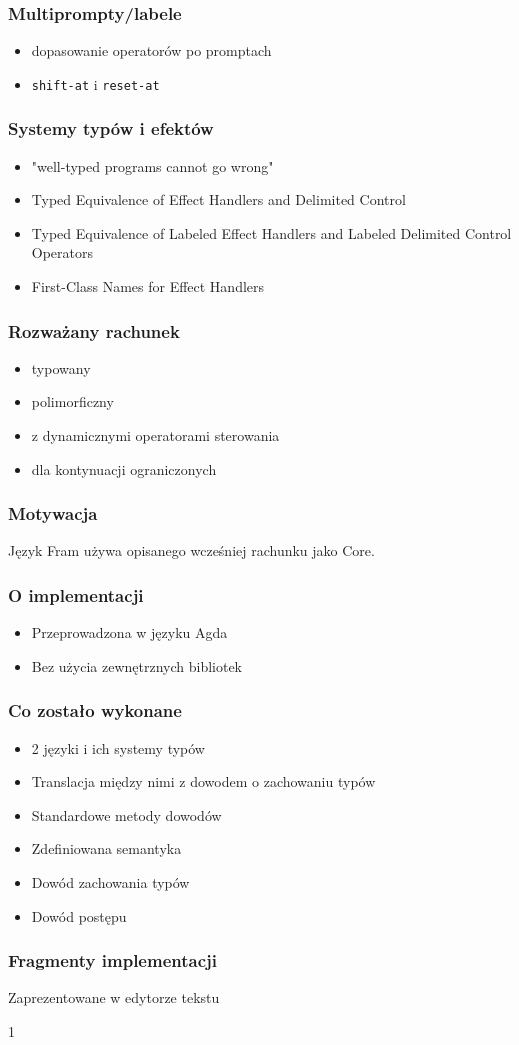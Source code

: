 \documentclass[polish]{beamer}
\begin{document}
\begin{frame}
\frametitle{Multiprompty/labele}
\begin{itemize}
\item dopasowanie operatorów po promptach
\item \texttt{shift-at} i \texttt{reset-at}
\end{itemize}
\end{frame}
\begin{frame}
\frametitle{Systemy typów i efektów}
\begin{itemize}
\item "well-typed programs cannot go wrong" 
\item Typed Equivalence of Effect Handlers and
Delimited Control \cite{typed_equivalence}
\item Typed Equivalence of Labeled Effect Handlers and Labeled Delimited
Control Operators \cite{typed_equivalence_label}
\item First-Class Names for Effect Handlers \cite{first_class_names}
\end{itemize}
\end{frame}
\begin{frame}
\frametitle{Rozważany rachunek}
\begin{itemize}
\item typowany
\item polimorficzny
\item z dynamicznymi operatorami sterowania
\item dla kontynuacji ograniczonych
\end{itemize}
\end{frame}
\begin{frame}
\frametitle{Motywacja}
Język Fram używa opisanego wcześniej rachunku jako Core.
\end{frame}
\begin{frame}
\frametitle{O implementacji}
\begin{itemize}
\item Przeprowadzona w języku Agda \cite{agda}
\item Bez użycia zewnętrznych bibliotek
\end{itemize}
\end{frame}
\begin{frame}
\frametitle{Co zostało wykonane}
\begin{itemize}
\item 2 języki i ich systemy typów
\item Translacja między nimi z dowodem o zachowaniu typów
\item Standardowe metody dowodów
\item Zdefiniowana semantyka
\item Dowód zachowania typów
\item Dowód postępu
\end{itemize}
\end{frame}
\begin{frame}
\frametitle{Fragmenty implementacji}
Zaprezentowane w  edytorze tekstu
\end{frame}
\begin{thebibliography}{1}

\end{thebibliography}
\end{document}
